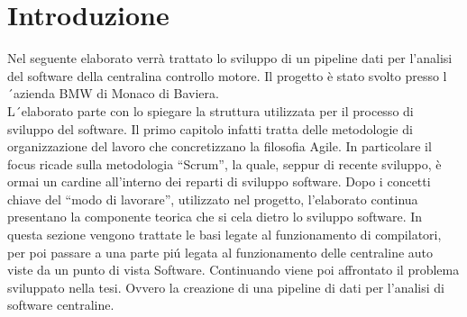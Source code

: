 \documentclass[../main.tex]{subfiles}
\begin{document}
\section{Introduzione}
Nel seguente elaborato verrà trattato lo sviluppo di un pipeline dati per l'analisi del software della centralina controllo motore. Il progetto è stato svolto presso l´azienda BMW di Monaco di Baviera.\\
L´elaborato parte con lo spiegare la struttura utilizzata per il processo di sviluppo del software. Il primo capitolo infatti tratta delle metodologie di organizzazione del lavoro che concretizzano la filosofia Agile. In particolare il focus ricade sulla metodologia “Scrum”, la quale, seppur di recente sviluppo, è ormai un cardine all'interno dei reparti di sviluppo software. 
Dopo i concetti chiave del “modo di lavorare”, utilizzato nel progetto, l'elaborato continua presentano la componente teorica che si cela dietro lo sviluppo software. In questa sezione vengono trattate le basi legate al funzionamento di compilatori, per poi passare a una parte piú legata al funzionamento delle centraline auto viste da un punto di vista Software.
Continuando viene poi affrontato il problema sviluppato nella tesi. Ovvero la creazione di una pipeline di dati per l'analisi di software centraline.\\
\end{document}

